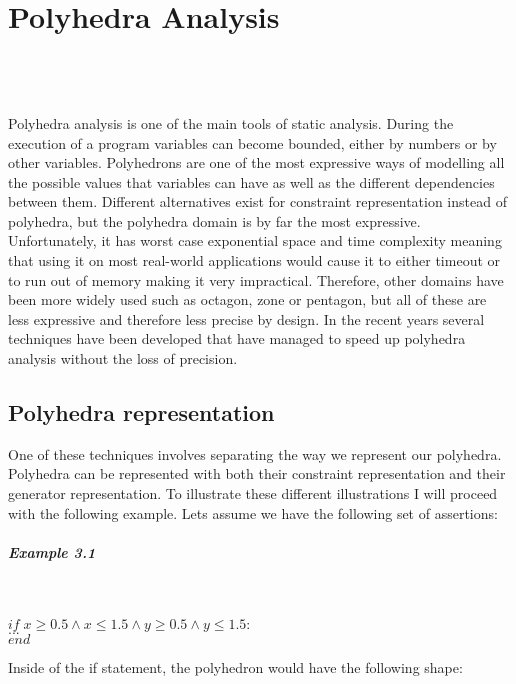 
\chapter{Polyhedra Analysis}
\mbox{}\\
\mbox{}\\
\mbox{}\\
Polyhedra analysis is one of the main tools of static analysis. During the execution of a program variables can become bounded, either by numbers or by other variables. Polyhedrons are one of the most expressive ways of modelling all the possible values that variables can have as well as the different dependencies between them. Different alternatives exist for constraint representation instead of polyhedra, but the polyhedra domain is by far the most expressive. Unfortunately, it has worst case exponential space and time complexity meaning that using it on most real-world applications would cause it to either timeout or to run out of memory making it very impractical. Therefore, other domains have been more widely used such as octagon, zone or pentagon, but all of these are less expressive and therefore less precise by design. In the recent years several techniques have been developed that have managed to speed up polyhedra analysis without the loss of precision.

\section{Polyhedra representation}
One of these techniques involves separating the way we represent our polyhedra. Polyhedra can be represented with both their constraint representation and their generator representation. To illustrate these different illustrations I will proceed with the following example. Lets assume we have the following set of assertions:
\paragraph{Example 3.1}\mbox{}\\
\begin{center}
	$if \; x\geq0.5\wedge x\leq 1.5 \wedge y\geq 0.5 \wedge y \leq1.5: $\\
	$...\;\;\;\;\;$\\
	$end \qquad\qquad\qquad\qquad\qquad\qquad\qquad\qquad$
\end{center}

Inside of the if statement, the polyhedron would have the following shape:


